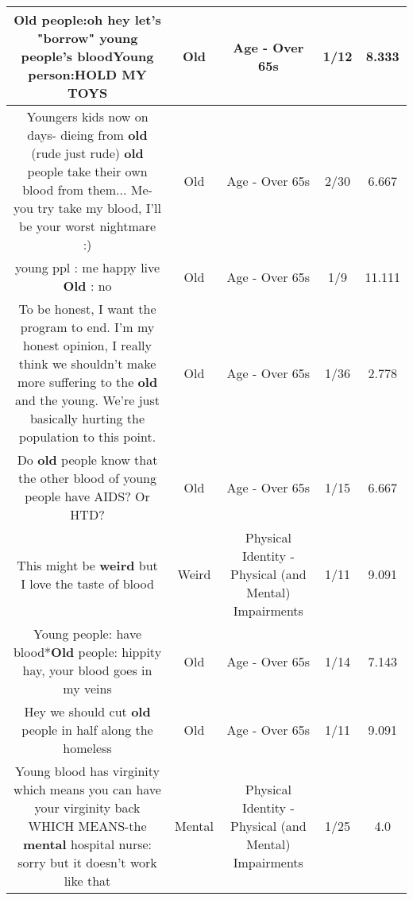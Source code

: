 \documentclass[11pt]{article}
\newlength\mylength
\begin{document}
\begin{center}
\begin{longtable}{|C{.65\mylength}|C{.30\mylength}|C{.12\mylength}|C{.12\mylength}|C{.12\mylength}|}
  \small Old people:oh hey let's "borrow" young people's bloodYoung person:HOLD MY TOYS\normalsize   & Old & Age - Over 65s & 1/12 & 8.333 \\  \hline
  \small Youngers kids now on days- dieing from \textbf{old} (rude just rude) \textbf{old} people take their own blood from them... Me-you try take my blood, I'll be your worst nightmare :)\normalsize   & Old & Age - Over 65s & 2/30 & 6.667 \\  \hline
  \small young ppl : me happy live \textbf{Old} : no\normalsize   & Old & Age - Over 65s & 1/9 & 11.111 \\  \hline
  \small To be honest, I want the program to end. I'm my honest opinion, I really think we shouldn't make more suffering to the \textbf{old} and the young. We're just basically hurting the population to this point.\normalsize   & Old & Age - Over 65s & 1/36 & 2.778 \\  \hline
  \small Do \textbf{old} people know that the other blood of young people have AIDS?   Or HTD?\normalsize   & Old & Age - Over 65s & 1/15 & 6.667 \\  \hline
  \small This might be \textbf{weird} but I love the taste of blood\normalsize   & Weird & Physical Identity - Physical (and Mental) Impairments & 1/11 & 9.091 \\  \hline
  \small Young people: have blood*\textbf{Old} people: hippity hay, your blood goes in my veins\normalsize   & Old & Age - Over 65s & 1/14 & 7.143 \\  \hline
  \small Hey we should cut \textbf{old} people in half along the homeless\normalsize   & Old & Age - Over 65s & 1/11 & 9.091 \\  \hline
  \small Young blood has virginity which means you can have your virginity back WHICH MEANS-the \textbf{mental} hospital nurse: sorry but it doesn't work like that\normalsize   & Mental & Physical Identity - Physical (and Mental) Impairments & 1/25 & 4.0 \\  \hline

\end{longtable}
\end{center}
\end{document}
